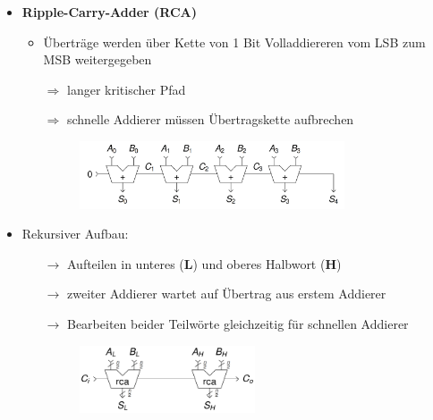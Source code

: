 \documentclass[11pt,a4paper]{article}
\begin{document}
\begin{itemize}
\item \textbf{Ripple-Carry-Adder (RCA)}
	\begin{itemize}
	\item Überträge werden über Kette von 1 Bit Volladdiereren vom LSB zum MSB weitergegeben
	\item[$\Rightarrow$] langer kritischer Pfad
	\item[$\Rightarrow$] schnelle Addierer müssen Übertragskette aufbrechen
	\item[]
		\begin{figure}[H]
			\begin{center}
			\includegraphics[height=2cm]{Bilder/rca}
			\end{center}
		\end{figure}
	\end{itemize}

	\item Rekursiver Aufbau:
		\begin{itemize}
		\item[$\rightarrow$] Aufteilen in unteres (\textbf{L}) und oberes Halbwort (\textbf{H})
		\item[$\rightarrow$] zweiter Addierer wartet auf Übertrag aus erstem Addierer
		\item[$\rightarrow$] Bearbeiten beider Teilwörte gleichzeitig für schnellen Addierer
		\item[]
			\begin{figure}[H]
				\begin{center}
				\includegraphics[height=2cm]{Bilder/rca2}
				\end{center}
			\end{figure}
		\end{itemize}
		
\pagebreak		
		

\end{itemize}
\end{document}

